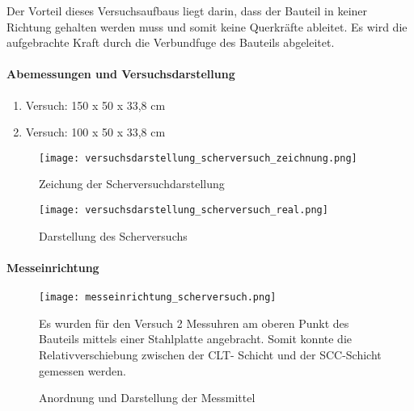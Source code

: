 \documentclass[12 pt,a4 paper ]{scrreprt}
\begin{document}
\clearpage{}

Der Vorteil dieses Versuchsaufbaus liegt darin, dass der Bauteil in keiner Richtung gehalten werden muss und somit keine Querkräfte ableitet. Es wird die aufgebrachte Kraft durch die Verbundfuge des Bauteils abgeleitet.

\paragraph{Abemessungen und Versuchsdarstellung}





\begin{enumerate}
\item Versuch: 150 x 50 x 33,8 cm
\item Versuch: 100 x 50 x 33,8 cm
\end{enumerate}

\begin{figure}
\begin{minipage}[hbt]{7cm}	
	\texttt{[image: versuchsdarstellung\_scherversuch\_zeichnung.png]}
	\caption{Zeichung der Scherversuchdarstellung}
	\label{Zeichung der Scherversuchdarstellung}
\end{minipage}
\hfill
\begin{minipage}[hbt]{7cm}
	\texttt{[image: versuchsdarstellung\_scherversuch\_real.png]}
	\caption{Darstellung des Scherversuchs}
	\label{Darstellung des Scherversuchs}
\end{minipage}
\end{figure}


\paragraph{Messeinrichtung}

\begin{figure}[h]
\begin{minipage}[hbt]{8cm}
	\texttt{[image: messeinrichtung\_scherversuch.png]}
	\caption{Anordnung und Darstellung der Messmittel }
	\label{messeinrichtung_scherversuch}
\end{minipage}
\hfill
\begin{minipage}[hbt]{8cm}
Es wurden für den Versuch 2 Messuhren am oberen Punkt des Bauteils mittels einer Stahlplatte angebracht. Somit konnte die Relativverschiebung zwischen der CLT- Schicht und der SCC-Schicht gemessen werden.

\end{minipage}
\end{figure}
\end{document}
